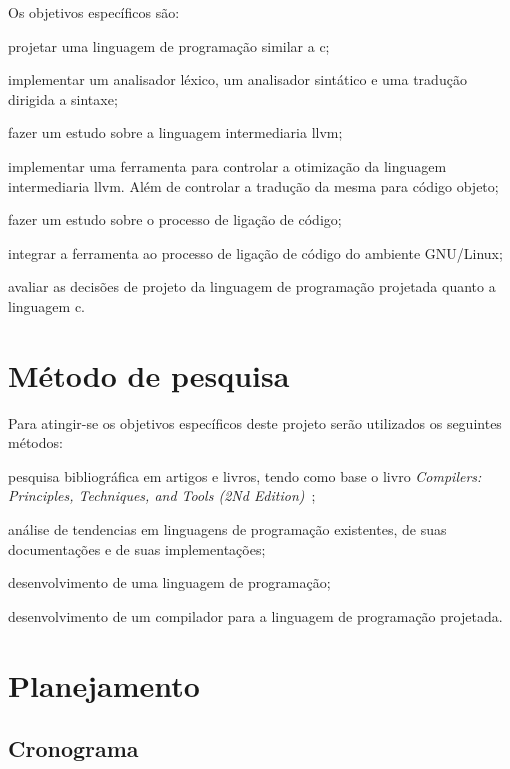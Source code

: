 \documentclass[
  12pt,
  openright,
  twoside,
  a4paper,
  english,
  brazil
]{abntex2}
\begin{document}
Os objetivos específicos são:
\begin{alineas}
  \item projetar uma linguagem de programação similar a c;
  \item implementar um analisador léxico, um analisador sintático e uma tradução dirigida a sintaxe;
  \item fazer um estudo sobre a linguagem intermediaria llvm;
  \item implementar uma ferramenta para controlar a otimização da linguagem intermediaria llvm. Além de controlar a tradução da mesma para código objeto;
  \item fazer um estudo sobre o processo de ligação de código;
  \item integrar a ferramenta ao processo de ligação de código do ambiente GNU/Linux;
  \item avaliar as decisões de projeto da linguagem de programação projetada quanto a linguagem c.
\end{alineas}

\chapter{Método de pesquisa}\label{cap:metodo_de_pesquisa}

Para atingir-se os objetivos específicos deste projeto serão utilizados os seguintes métodos:
\begin{alineas}
  \item pesquisa bibliográfica em artigos e livros, tendo como base o livro \textit{Compilers: Principles, Techniques, and Tools (2Nd Edition)}~\cite{Aho:2006:CPT:1177220};
  \item análise de tendencias em linguagens de programação existentes, de suas documentações e de suas implementações;
  \item desenvolvimento de uma linguagem de programação;
  \item desenvolvimento de um compilador para a linguagem de programação projetada.
\end{alineas}

\chapter{Planejamento}

\section{Cronograma}\label{cap:cronograma}
\end{document}
